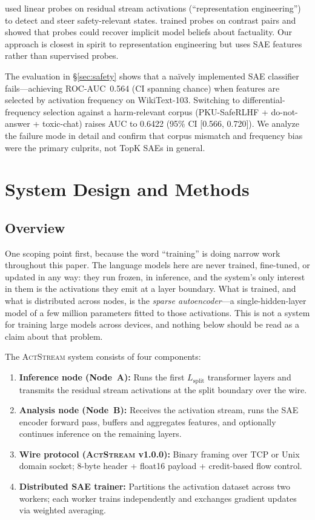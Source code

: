 \documentclass[11pt]{article}
\newcommand{\actstream}{\textsc{ActStream}}
\begin{document}
\citet{zou2023repeng} used linear probes on residual stream activations (``representation engineering'') to detect and steer safety-relevant states. \citet{burns2022discovering} trained probes on contrast pairs and showed that probes could recover implicit model beliefs about factuality. Our approach is closest in spirit to representation engineering but uses SAE features rather than supervised probes.

The evaluation in \S\ref{sec:safety} shows that a na{\"i}vely implemented SAE classifier fails---achieving ROC-AUC~0.564 (CI spanning chance) when features are selected by activation frequency on WikiText-103. Switching to differential-frequency selection against a harm-relevant corpus (PKU-SafeRLHF + do-not-answer + toxic-chat) raises AUC to 0.6422 (95\% CI [0.566, 0.720]). We analyze the failure mode in detail and confirm that corpus mismatch and frequency bias were the primary culprits, not TopK SAEs in general.

\section{System Design and Methods}
\label{sec:system}

\subsection{Overview}

One scoping point first, because the word ``training'' is doing narrow work throughout
this paper. The language models here are never trained, fine-tuned, or updated in any
way: they run frozen, in inference, and the system's only interest in them is the
activations they emit at a layer boundary. What is trained, and what is distributed
across nodes, is the \emph{sparse autoencoder}---a single-hidden-layer model of a few
million parameters fitted to those activations. This is not a system for training large
models across devices, and nothing below should be read as a claim about that problem.

The \actstream{} system consists of four components:

\begin{enumerate}
\item \textbf{Inference node (Node~A):} Runs the first $L_{\mathrm{split}}$ transformer layers and transmits the residual stream activations at the split boundary over the wire.
\item \textbf{Analysis node (Node~B):} Receives the activation stream, runs the SAE encoder forward pass, buffers and aggregates features, and optionally continues inference on the remaining layers.
\item \textbf{Wire protocol (\actstream{} v1.0.0):} Binary framing over TCP or Unix domain socket; 8-byte header + float16 payload + credit-based flow control.
\item \textbf{Distributed SAE trainer:} Partitions the activation dataset across two workers; each worker trains independently and exchanges gradient updates via weighted averaging.
\end{enumerate}
\end{document}
